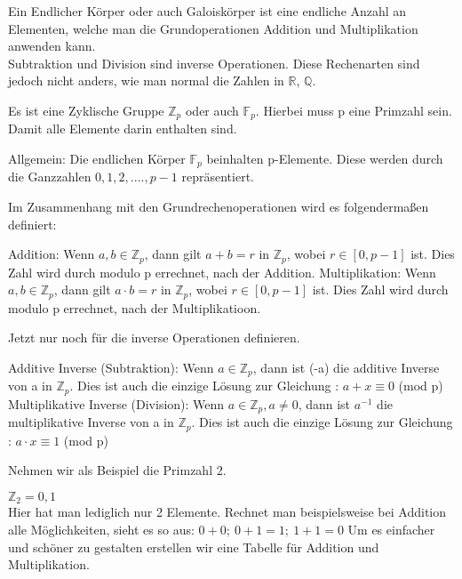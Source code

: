 Ein Endlicher Körper oder auch Galoiskörper ist eine endliche Anzahl an Elementen, welche man die Grundoperationen Addition und Multiplikation anwenden kann.\\

Subtraktion und Division sind inverse Operationen. Diese Rechenarten sind jedoch nicht anders, wie man normal die Zahlen in $\mathbb{R}$, $\mathbb{Q}$.

Es ist eine Zyklische Gruppe $ \mathbb{Z}_p $ oder auch $ \mathbb{F}_p $. Hierbei muss p eine Primzahl sein. Damit alle Elemente darin enthalten sind. 

Allgemein: Die endlichen Körper $\mathbb{F}_p$ beinhalten p-Elemente. Diese werden durch die Ganzzahlen ${0,1,2,....,p-1}$ repräsentiert. 

Im Zusammenhang mit den Grundrechenoperationen wird es folgendermaßen definiert:

Addition: Wenn $ a, b \in \mathbb{Z}_p $, dann gilt $ a+b =r$ in $ \mathbb{Z}_p $, wobei $r \in [0, p-1]$ ist. Dies Zahl wird durch modulo p errechnet, nach der Addition.
Multiplikation: Wenn $ a, b \in \mathbb{Z}_p $, dann gilt $ a \cdot b =r$ in $ \mathbb{Z}_p $, wobei $r \in [0, p-1]$ ist. Dies Zahl wird durch modulo p errechnet, nach der Multiplikatioon.

Jetzt nur noch für die inverse Operationen definieren.

Additive Inverse (Subtraktion): Wenn $a \in \mathbb{Z}_p$, dann ist (-a) die additive Inverse von a in $\mathbb{Z}_p$. Dies ist auch die einzige Lösung zur Gleichung : $a + x \equiv 0$ (mod p)
Multiplikative Inverse (Division): Wenn $a \in \mathbb{Z}_p, a \neq 0 $,  dann ist $a^{-1}$ die multiplikative Inverse von a in $\mathbb{Z}_p$. Dies ist auch die einzige Lösung zur Gleichung : $a \cdot x \equiv 1$ (mod p)

Nehmen wir als Beispiel die Primzahl 2.

$ \mathbb{Z}_2 = {0,1} $\\

Hier hat man lediglich nur 2 Elemente. Rechnet man beispielsweise bei Addition alle Möglichkeiten, sieht es so aus: $0 + 0;\ 0 + 1 = 1;\ 1 + 1 = 0$ 
Um es einfacher und schöner zu gestalten erstellen wir eine Tabelle für Addition und Multiplikation.


